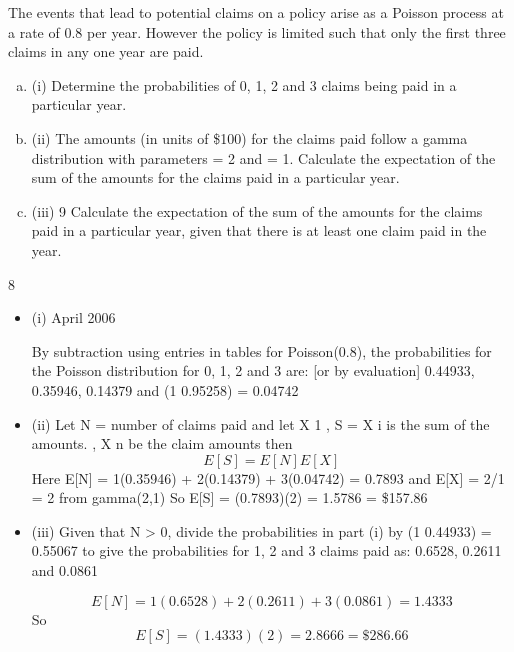 \documentclass[a4paper,12pt]{article}
\begin{document}
The events that lead to potential claims on a policy arise as a Poisson process at a rate
of 0.8 per year. However the policy is limited such that only the first three claims in
any one year are paid.

\begin{enumerate}[(a)]
\item 
(i) Determine the probabilities of 0, 1, 2 and 3 claims being paid in a particular
year.

\item 
(ii) The amounts (in units of \$100) for the claims paid follow a gamma
distribution with parameters = 2 and = 1.
Calculate the expectation of the sum of the amounts for the claims paid in a
particular year.

\item (iii)
9
Calculate the expectation of the sum of the amounts for the claims paid in a
particular year, given that there is at least one claim paid in the year.


\end{enumerate}
\newpage




8
\begin{itemize}
\item (i)
April 2006
 
By subtraction using entries in tables for Poisson(0.8), the probabilities for the Poisson distribution for 0, 1, 2 and 3 are: [or by evaluation]
0.44933, 0.35946, 0.14379 and (1 0.95258) = 0.04742
\item (ii)
Let N = number of claims paid and let X 1 ,
S = X i is the sum of the amounts.
, X n be the claim amounts then
\[E[S] = E[N]E[X]\]
Here E[N] = 1(0.35946) + 2(0.14379) + 3(0.04742) = 0.7893
and E[X] = 2/1 = 2 from gamma(2,1)
So E[S] = (0.7893)(2) = 1.5786 = \$157.86
\item (iii)
Given that N > 0, divide the probabilities in part (i) by (1 0.44933) =
0.55067 to give the probabilities for 1, 2 and 3 claims paid as:
0.6528, 0.2611 and 0.0861

\[E[N] = 1(0.6528) + 2(0.2611) + 3(0.0861) = 1.4333\]
So \[E[S] = (1.4333)(2) = 2.8666 = \$286.66\]
\end{itemize}
\end{document}
